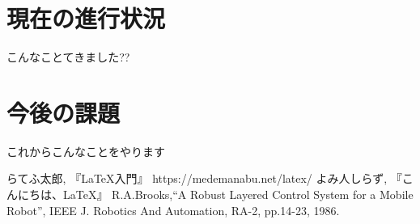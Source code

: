 \documentclass[a4j, twocolumn, 8pt,pdflatex,ja=standard]{bxjsarticle}
\begin{document}
\section{現在の進行状況}
こんなことてきました??
\section{今後の課題}
これからこんなことをやります
\small{
\begin{thebibliography}{9}
 らてふ太郎, 『LaTeX入門』 https://medemanabu.net/latex/
 よみ人しらず, 『こんにちは、LaTeX』
 R.A.Brooks,``A Robust Layered Control System for a Mobile Robot'', IEEE J. Robotics And Automation, RA-2, pp.14-23, 1986.
\end{thebibliography}

}

%
% 
% 
\end{document}
